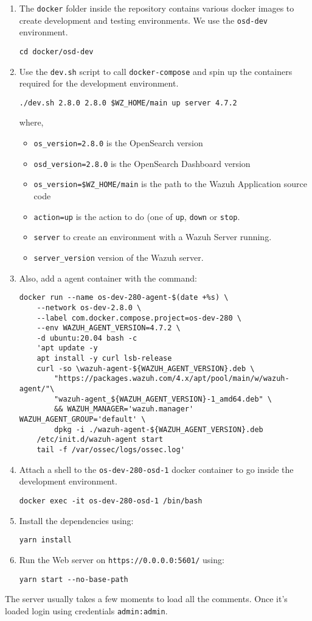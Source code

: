 \begin{enumerate}
    \item The \texttt{docker} folder inside the repository contains various docker images to create development and testing environments. We use the \texttt{osd-dev} environment.
    \begin{verbatim}
cd docker/osd-dev
    \end{verbatim}
    \item Use the \texttt{dev.sh} script to call \texttt{docker-compose} and spin up the containers required for the development environment.
    \begin{verbatim}
./dev.sh 2.8.0 2.8.0 $WZ_HOME/main up server 4.7.2
    \end{verbatim}
    where, 
    \begin{itemize}
        \item \texttt{os\_version=2.8.0} is the OpenSearch version
        \item \texttt{osd\_version=2.8.0} is the OpenSearch Dashboard version
        \item \texttt{os\_version=\$WZ\_HOME/main} is the path to the Wazuh Application source code
        \item \texttt{action=up} is the action to do (one of \texttt{up}, \texttt{down} or \texttt{stop}.
        \item \texttt{server} to create an environment with a Wazuh Server running.
        \item \texttt{server\_version} version of the Wazuh server.
    \end{itemize}
    \item Also, add a agent container with the command:
    \begin{verbatim}
docker run --name os-dev-280-agent-$(date +%s) \
    --network os-dev-2.8.0 \
    --label com.docker.compose.project=os-dev-280 \
    --env WAZUH_AGENT_VERSION=4.7.2 \
    -d ubuntu:20.04 bash -c 
    'apt update -y
    apt install -y curl lsb-release
    curl -so \wazuh-agent-${WAZUH_AGENT_VERSION}.deb \
        "https://packages.wazuh.com/4.x/apt/pool/main/w/wazuh-agent/"\
        "wazuh-agent_${WAZUH_AGENT_VERSION}-1_amd64.deb" \
        && WAZUH_MANAGER='wazuh.manager' WAZUH_AGENT_GROUP='default' \
        dpkg -i ./wazuh-agent-${WAZUH_AGENT_VERSION}.deb
    /etc/init.d/wazuh-agent start
    tail -f /var/ossec/logs/ossec.log'
    \end{verbatim}
    \item Attach a shell to the \texttt{os-dev-280-osd-1} docker container to go inside the development environment.
    \begin{verbatim}
docker exec -it os-dev-280-osd-1 /bin/bash
    \end{verbatim}
    \item Install the dependencies using:
    \begin{verbatim}
yarn install 
    \end{verbatim}
    \item Run the Web server on \texttt{https://0.0.0.0:5601/} using:
    \begin{verbatim}
yarn start --no-base-path 
    \end{verbatim}
\end{enumerate}
The server usually takes a few moments to load all the comments. Once it's loaded login using credentials \texttt{admin:admin}.